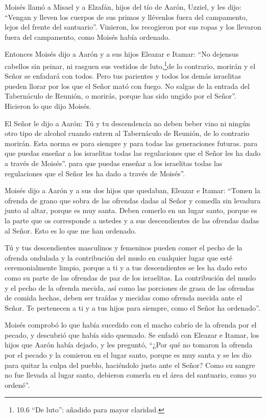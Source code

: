  Moisés llamó a Misael y a Elzafán, hijos del tío de Aarón,
Uzziel, y les dijo: ``Vengan y lleven los cuerpos de sus primos y
llévenlos fuera del campamento, lejos del frente del santuario''.
 Vinieron, los recogieron por sus ropas y los llevaron fuera
del campamento, como Moisés había ordenado.

 Entonces Moisés dijo a Aarón y a sus hijos Eleazar e
Itamar: ``No dejensus cabellos sin peinar, ni rasguen sus vestidos de
luto,\footnote{10.6 ``De luto'': añadido para mayor claridad.}de lo
contrario, morirán y el Señor se enfadará con todos. Pero tus parientes
y todos los demás israelitas pueden llorar por los que el Señor mató con
fuego.  No salgas de la entrada del Tabernáculo de Reunión,
o morirás, porque has sido ungido por el Señor''. Hicieron lo que dijo
Moisés.

 El Señor le dijo a Aarón:  Tú y tu descendencia
no deben beber vino ni ningún otro tipo de alcohol cuando entren al
Tabernáculo de Reunión, de lo contrario morirán. Esta norma es para
siempre y para todas las generaciones futuras.  para que
puedas enseñar a los israelitas todas las regulaciones que el Señor les
ha dado a través de Moisés''.  para que puedas enseñar a
los israelitas todas las regulaciones que el Señor les ha dado a través
de Moisés''.

 Moisés dijo a Aarón y a sus dos hijos que quedaban,
Eleazar e Itamar: ``Tomen la ofrenda de grano que sobra de las ofrendas
dadas al Señor y comedla sin levadura junto al altar, porque es muy
santa.  Deben comerlo en un lugar santo, porque es la parte
que os corresponde a ustedes y a sus descendientes de las ofrendas dadas
al Señor. Esto es lo que me han ordenado.

 Tú y tus descendientes masculinos y femeninos pueden comer
el pecho de la ofrenda ondulada y la contribución del muslo en cualquier
lugar que esté ceremonialmente limpio, porque a ti y a tus descendientes
se les ha dado esto como su parte de las ofrendas de paz de los
israelitas.  La contribución del muslo y el pecho de la
ofrenda mecida, así como las porciones de grasa de las ofrendas de
comida hechas, deben ser traídas y mecidas como ofrenda mecida ante el
Señor. Te pertenecen a ti y a tus hijos para siempre, como el Señor ha
ordenado''.

 Moisés comprobó lo que había sucedido con el macho cabrío
de la ofrenda por el pecado, y descubrió que había sido quemado. Se
enfadó con Eleazar e Itamar, los hijos que Aarón había dejado, y les
preguntó,  ``¿Por qué no tomaron la ofrenda por el pecado y
la comieron en el lugar santo, porque es muy santa y se les dio para
quitar la culpa del pueblo, haciéndolo justo ante el Señor?
 Como su sangre no fue llevada al lugar santo, debieron
comerla en el área del santuario, como yo ordené''.

